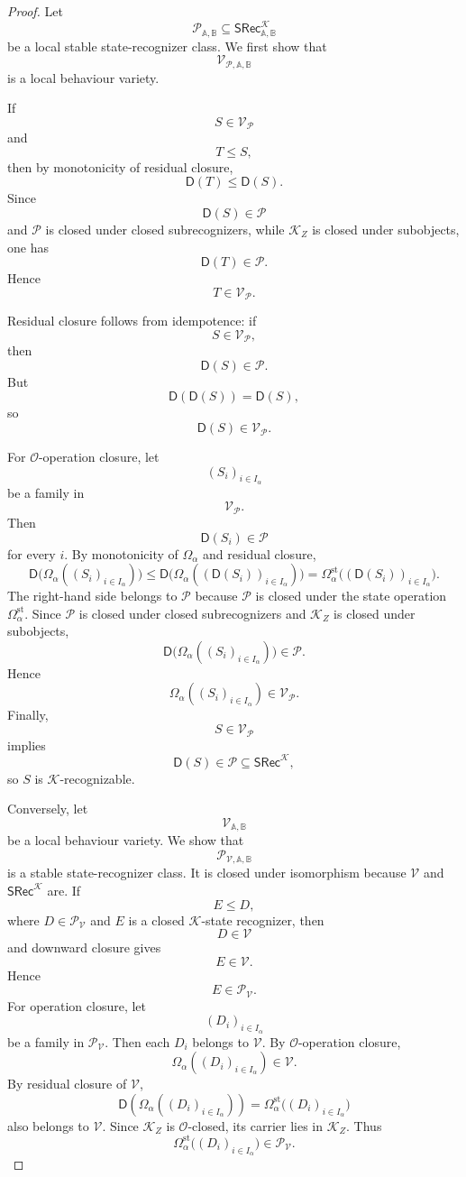 \begin{proof}
Let
\[
\mathcal P_{\mathbb A,\mathbb B}
\subseteq
\mathsf{SRec}^{\mathcal K}_{\mathbb A,\mathbb B}
\]
be a local stable state-recognizer class. We first show that
\[
\mathcal V_{\mathcal P,\mathbb A,\mathbb B}
\]
is a local behaviour variety.

If
\[
S\in\mathcal V_{\mathcal P}
\]
and
\[
T\leq S,
\]
then by monotonicity of residual closure,
\[
\mathsf D(T)\leq\mathsf D(S).
\]
Since
\[
\mathsf D(S)\in\mathcal P
\]
and \(\mathcal P\) is closed under closed subrecognizers, while
\(\mathcal K_Z\) is closed under subobjects, one has
\[
\mathsf D(T)\in\mathcal P.
\]
Hence
\[
T\in\mathcal V_{\mathcal P}.
\]

Residual closure follows from idempotence:
if
\[
S\in\mathcal V_{\mathcal P},
\]
then
\[
\mathsf D(S)\in\mathcal P.
\]
But
\[
\mathsf D(\mathsf D(S))=\mathsf D(S),
\]
so
\[
\mathsf D(S)\in\mathcal V_{\mathcal P}.
\]

For \(\mathcal O\)-operation closure, let
\[
(S_i)_{i\in I_\alpha}
\]
be a family in
\[
\mathcal V_{\mathcal P}.
\]
Then
\[
\mathsf D(S_i)\in\mathcal P
\]
for every \(i\). By monotonicity of \(\Omega_\alpha\) and residual closure,
\[
\mathsf D\bigl(\Omega_\alpha((S_i)_{i\in I_\alpha})\bigr)
\leq
\mathsf D\bigl(\Omega_\alpha((\mathsf D(S_i))_{i\in I_\alpha})\bigr)
=
\Omega_\alpha^{\mathrm{st}}\bigl((\mathsf D(S_i))_{i\in I_\alpha}\bigr).
\]
The right-hand side belongs to \(\mathcal P\) because \(\mathcal P\) is closed
under the state operation \(\Omega_\alpha^{\mathrm{st}}\). Since
\(\mathcal P\) is closed under closed subrecognizers and \(\mathcal K_Z\) is
closed under subobjects,
\[
\mathsf D\bigl(\Omega_\alpha((S_i)_{i\in I_\alpha})\bigr)\in\mathcal P.
\]
Hence
\[
\Omega_\alpha((S_i)_{i\in I_\alpha})\in\mathcal V_{\mathcal P}.
\]
Finally,
\[
S\in\mathcal V_{\mathcal P}
\]
implies
\[
\mathsf D(S)\in\mathcal P\subseteq
\mathsf{SRec}^{\mathcal K},
\]
so \(S\) is \(\mathcal K\)-recognizable.

Conversely, let
\[
\mathcal V_{\mathbb A,\mathbb B}
\]
be a local behaviour variety. We show that
\[
\mathcal P_{\mathcal V,\mathbb A,\mathbb B}
\]
is a stable state-recognizer class. It is closed under isomorphism because
\(\mathcal V\) and \(\mathsf{SRec}^{\mathcal K}\) are. If
\[
E\leq D,
\]
where \(D\in\mathcal P_{\mathcal V}\) and \(E\) is a closed
\(\mathcal K\)-state recognizer, then
\[
D\in\mathcal V
\]
and downward closure gives
\[
E\in\mathcal V.
\]
Hence
\[
E\in\mathcal P_{\mathcal V}.
\]
For operation closure, let
\[
(D_i)_{i\in I_\alpha}
\]
be a family in \(\mathcal P_{\mathcal V}\). Then each \(D_i\) belongs to
\(\mathcal V\). By \(\mathcal O\)-operation closure,
\[
\Omega_\alpha((D_i)_{i\in I_\alpha})\in\mathcal V.
\]
By residual closure of \(\mathcal V\),
\[
\mathsf D(\Omega_\alpha((D_i)_{i\in I_\alpha}))
=
\Omega_\alpha^{\mathrm{st}}\bigl((D_i)_{i\in I_\alpha}\bigr)
\]
also belongs to \(\mathcal V\). Since \(\mathcal K_Z\) is
\(\mathcal O\)-closed, its carrier lies in \(\mathcal K_Z\). Thus
\[
\Omega_\alpha^{\mathrm{st}}\bigl((D_i)_{i\in I_\alpha}\bigr)
\in\mathcal P_{\mathcal V}.
\]


\end{proof}
